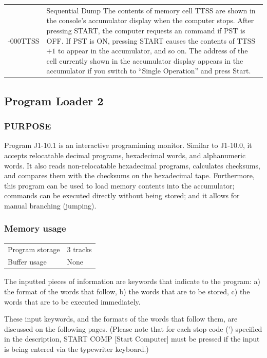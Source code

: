 \documentclass{article}
\begin{document}
\begin{enumerate}
\begin{longtable}{l p{11.5cm}}
\addlinespace
-000TTSS  & Sequential Dump \newline
            The contents of memory cell TTSS are shown in the console's accumulator display when the computer stops. After pressing START, the computer requests an command if PST is OFF. If PST is ON, pressing START causes the contents of TTSS$ + 1$ to appear in the accumulator, and so on. The address of the cell currently shown in the accumulator display appears in the accumulator if you switch to ``Single Operation'' and press Start. \\
\end{longtable}

\newpage
\subsection{Program Loader 2}
\subsubsection{PURPOSE}
Program J1-10.1 is an interactive programiming monitor. Similar to J1-10.0, it accepts relocatable decimal programs, hexadecimal words, and alphanumeric words. It also reads non-relocatable hexadecimal programs, calculates checksums, and compares them with the checksums on the hexadecimal tape. Furthermore, this program can be used to load memory contents into the accumulator; commands can be executed directly without being stored; and it allows for manual branching (jumping).

\subsubsection*{Memory usage}
\begin{center}
\begin{tabular}{ll}
    \toprule
    Program storage & 3 tracks \\
    Buffer usage & None \\
    \bottomrule
\end{tabular}
\end{center}

The inputted pieces of information are keywords that indicate to the program:
a) the format of the words that follow, b) the words that are to be stored, c) the words that are to be executed immediately.

These input keywords, and the formats of the words that follow them, are discussed on the following pages. (Please note that for each stop code (') specified in the description, START COMP [Start Computer] must be pressed if the input is being entered via the typewriter keyboard.)


\end{enumerate}
\end{document}

